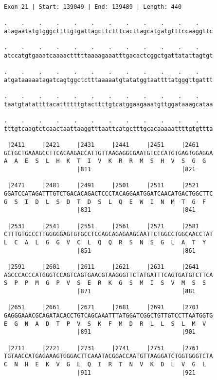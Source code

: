 \documentclass{article}
\begin{document}
\begin{Verbatim}
Exon 21 | Start: 139049 | End: 139489 | Length: 440
 
.    .    .    .    .    .    .    .    .    .    .    .    
atagaatatgtgggcttttgtgattagcttctttcacttagcatgatgtttccaaggttc
  
.    .    .    .    .    .    .    .    .    .    .    .    
atccatgtgaaatcaaaactttttaaaagaaatttgacactcggctgattatattagtgt
  
.    .    .    .    .    .    .    .    .    .    .    .    
atgataaaaatagatcagtggctctttaaaaatgtatatggtaattttatgggttgattt
  
.    .    .    .    .    .    .    .    .    .    .    .    
taatgtatattttacattttttgtacttttgtcatggaagaaatgttggataaagcataa
  
.    .    .    .    .    .    .    .    .    .    .    .    
tttgtcaagtctcaactaattaaggtttaattcatgctttgcacaaaaattttgtgttta
  
 |2411     |2421     |2431     |2441     |2451     |2461    
GCTGCTGAAAGCCTTCACAAGACCATTGTTAAGAGGCGAATGTCCCATGTGAGTGGAGGA
A  A  E  S  L  H  K  T  I  V  K  R  R  M  S  H  V  S  G  G  
                     |811                          |821     
  
 |2471     |2481     |2491     |2501     |2511     |2521    
GGATCCATAGATTTGTCTGACACAGACTCCCTACAGGAATGGATCAACATGACTGGCTTC
G  S  I  D  L  S  D  T  D  S  L  Q  E  W  I  N  M  T  G  F  
                     |831                          |841     
  
 |2531     |2541     |2551     |2561     |2571     |2581    
CTTTGTGCCCTTGGGGGAGTGTGCCTCCAGCAGAGAAGCAATTCTGGCCTGGCAACCTAT
L  C  A  L  G  G  V  C  L  Q  Q  R  S  N  S  G  L  A  T  Y  
                     |851                          |861     
  
 |2591     |2601     |2611     |2621     |2631     |2641    
AGCCCACCCATGGGTCCAGTCAGTGAACGTAAGGGTTCTATGATTTCAGTGATGTCTTCA
S  P  P  M  G  P  V  S  E  R  K  G  S  M  I  S  V  M  S  S  
                     |871                          |881     
  
 |2651     |2661     |2671     |2681     |2691     |2701    
GAGGGAAACGCAGATACACCTGTCAGCAAATTTATGGATCGGCTGTTGTCCTTAATGGTG
E  G  N  A  D  T  P  V  S  K  F  M  D  R  L  L  S  L  M  V  
                     |891                          |901     
  
 |2711     |2721     |2731     |2741     |2751     |2761    
TGTAACCATGAGAAAGTGGGACTTCAAATACGGACCAATGTTAAGGATCTGGTGGGTCTA
C  N  H  E  K  V  G  L  Q  I  R  T  N  V  K  D  L  V  G  L  
                     |911                          |921     
  

\end{Verbatim}
\end{document}
